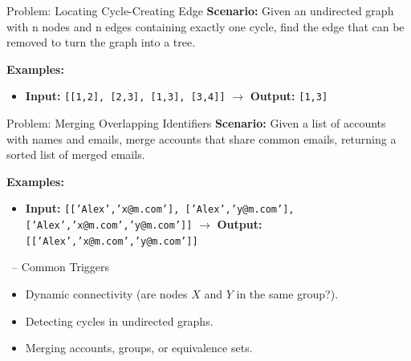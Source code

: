 \begin{frame}[fragile]{Problem: Locating Cycle-Creating Edge}
  \textbf{Scenario:}
  Given an undirected graph with n nodes and n edges containing exactly one cycle, find the edge that can be removed to turn the graph into a tree.
  
  \vspace{0.3cm}
  \textbf{Examples:}
  \begin{itemize}
    \item \textbf{Input:} \texttt{[[1,2], [2,3], [1,3], [3,4]]} $\rightarrow$ \textbf{Output:} \texttt{[1,3]}
  \end{itemize}
\end{frame}

\begin{frame}[fragile]{Problem: Merging Overlapping Identifiers}
  \textbf{Scenario:}
  Given a list of accounts with names and emails, merge accounts that share common emails, returning a sorted list of merged emails.
  
  \vspace{0.3cm}
  \textbf{Examples:}
  \begin{itemize}
    \item \textbf{Input:} \texttt{[['Alex','x@m.com'], ['Alex','y@m.com'], ['Alex','x@m.com','y@m.com']]} $\rightarrow$ \textbf{Output:} \texttt{[['Alex','x@m.com','y@m.com']]}
  \end{itemize}
\end{frame}

\begin{frame}{\secname\ -- Common Triggers}
  \begin{itemize}
    \item Dynamic connectivity (are nodes $X$ and $Y$ in the same group?).
        \item Detecting cycles in undirected graphs.
        \item Merging accounts, groups, or equivalence sets.
  \end{itemize}
\end{frame}
